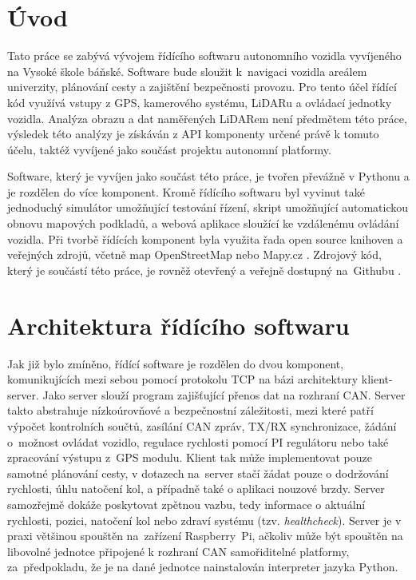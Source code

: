 \documentclass[czech, bachelor]{diploma}
\begin{document}
\MakeTitlePages

\chapter{Úvod} \label{sec:Introduction}
Tato práce se zabývá vývojem řídícího softwaru autonomního vozidla vyvíjeného na Vysoké škole báňské. Software bude sloužit
k~navigaci vozidla areálem univerzity, plánování cesty a zajištění bezpečnosti provozu. Pro tento účel řídící kód využívá vstupy
z GPS, kamerového systému, LiDARu a ovládací jednotky vozidla. Analýza obrazu a dat naměřených LiDARem není předmětem této práce,
výsledek této analýzy je získáván z API komponenty určené právě k tomuto účelu, taktéž vyvíjené jako součást projektu autonomní
platformy.

Software, který je vyvíjen jako součást této práce, je tvořen převážně v Pythonu a je rozdělen do více komponent. Kromě řídícího
softwaru byl vyvinut také jednoduchý simulátor umožňující testování řízení, skript umožňující automatickou obnovu mapových
podkladů, a webová aplikace sloužící ke vzdálenému ovládání vozidla. Při tvorbě řídících komponent byla využita řada open source
knihoven a veřejných zdrojů, včetně map OpenStreetMap \cite{openstreetmap-source} nebo Mapy.cz \cite{mapycz-source}. Zdrojový kód,
který je součástí této práce, je rovněž otevřený a veřejně dostupný na~Githubu \cite{car-client-source, car-webapp-source,
car-map-downloader-source, car-can-source, car-simulator-source, geologger-source}.

\chapter{Architektura řídícího softwaru} \label{software-architecture}
Jak již bylo zmíněno, řídící software je rozdělen do dvou komponent, komunikujících mezi sebou pomocí protokolu TCP na bázi
architektury klient-server. Jako server slouží program zajišťující přenos dat na rozhraní CAN. Server takto abstrahuje
nízkoúrovňové a bezpečnostní záležitosti, mezi které patří výpočet kontrolních součtů, zasílání CAN zpráv, TX/RX synchronizace,
žádání o~možnost ovládat vozidlo, regulace rychlosti pomocí PI regulátoru nebo také zpracování výstupu z~GPS modulu. Klient tak
může implementovat pouze samotné plánování cesty, v dotazech na~server stačí žádat pouze o dodržování rychlosti, úhlu natočení
kol, a případně také o aplikaci nouzové brzdy. Server samozřejmě dokáže poskytovat zpětnou vazbu, tedy informace o aktuální
rychlosti, pozici, natočení kol nebo zdraví systému (tzv. \emph{healthcheck}). Server je v praxi většinou spouštěn na~zařízení
Raspberry~Pi, ačkoliv může být spouštěn na libovolné jednotce připojené k rozhraní CAN samořiditelné platformy, za~předpokladu,
že je na dané jednotce nainstalován interpreter jazyka Python.
\end{document}
